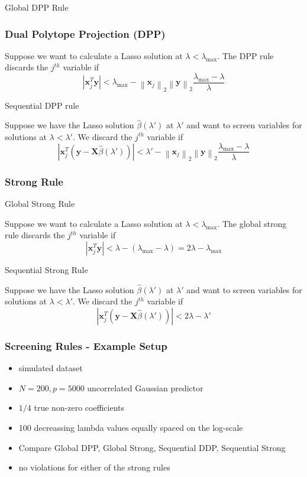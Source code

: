 \documentclass[handout]{beamer}
\newcommand{\Norm}[1]{\left\lVert#1\right\rVert}
\newcommand{\norm}[1]{\left\lvert#1\right\rvert}
\begin{document}
\begin{frame}

{\hspace{5pt}\Large Global DPP Rule}
\vspace{15pt}

\frametitle{Dual Polytope Projection (DPP)}
Suppose we want to calculate a Lasso solution at $\lambda<\lambda_{\max}$. The DPP rule discards the $j^{th}$ variable if 
\[\norm{\mathbf{x}_j^T\mathbf{y}}<\lambda_{\max}-\Norm{\mathbf{x}_j}_2\Norm{\mathbf{y}}_2\frac{\lambda_{\max}-\lambda}{\lambda}\]

\vspace{5pt}
{\hspace{5pt}\Large Sequential DPP rule}
\vspace{15pt}

Suppose we have the Lasso solution $\hat\beta(\lambda')$ at $\lambda'$ and want to screen variables for solutions at $\lambda<\lambda'$. We discard the $j^{th}$ variable if 
\[\norm{\mathbf{x}_j^T(\mathbf{y}-\mathbf{X}\hat{\beta}(\lambda'))}<\lambda'-\Norm{\mathbf{x}_j}_2\Norm{\mathbf{y}}_2\frac{\lambda_{\max}-\lambda}{\lambda}\]
\end{frame}

\begin{frame}
\frametitle{Strong Rule}

{\hspace{5pt}\Large Global Strong Rule}
\vspace{15pt}

Suppose we want to calculate a Lasso solution at $\lambda<\lambda_{\max}$. The global strong rule discards the $j^{th}$ variable if 
\[\norm{\mathbf{x}_j^T\mathbf{y}}<\lambda-(\lambda_{\max}-\lambda)=2\lambda-\lambda_{\max}\]

\vspace{5pt}
{\hspace{5pt}\Large Sequential Strong Rule}
\vspace{15pt}

Suppose we have the Lasso solution $\hat\beta(\lambda')$ at $\lambda'$ and want to screen variables for solutions at $\lambda<\lambda'$. We discard the $j^{th}$ variable if 
\[\norm{\mathbf{x}_j^T(\mathbf{y}-\mathbf{X}\hat{\beta}(\lambda'))}<2\lambda-\lambda'\]
\end{frame}

\begin{frame}
\frametitle{Screening Rules - Example Setup}

\begin{itemize}
	\item simulated dataset
	\item $N = 200, p = 5000$ uncorrelated Gaussian predictor
	\item $1/4$ true non-zero coefficients 
	\item 100 decreassing lambda values equally spaced on the log-scale
	\item Compare Global DPP, Global Strong, Sequential DDP, Sequential Strong
	\item no violations for either of the strong rules
\end{itemize}

\end{frame}
\end{document}
